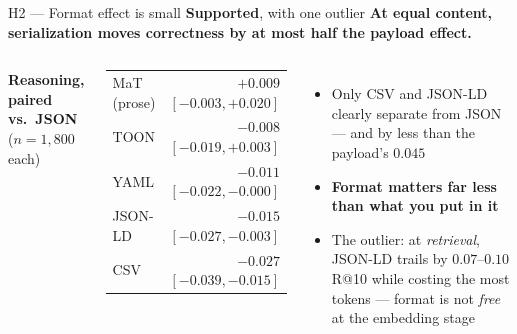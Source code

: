 \documentclass[aspectratio=169,10pt]{beamer}
\newcommand{\verdict}[1]{\textcolor{good}{\textbf{#1}}}
\newcommand{\muted}[1]{\textcolor{inksec}{#1}}
\begin{document}
\begin{frame}{H2 --- Format effect is small \hfill \verdict{Supported}\muted{, with one outlier}}
  \textbf{At equal content, serialization moves correctness by at most half the payload effect.}
  \bigskip
  \begin{columns}[t]
    \textbf{Reasoning, paired vs.\ JSON} \muted{($n{=}1{,}800$ each)}
    \begin{center}
    \renewcommand{\arraystretch}{1.25}
    \begin{tabular}{@{}lr@{}}
      \toprule
      MaT (prose) & $+0.009$ \;\muted{$[-0.003,+0.020]$} \\
      TOON & $-0.008$ \;\muted{$[-0.019,+0.003]$} \\
      YAML & $-0.011$ \;\muted{$[-0.022,-0.000]$} \\
      JSON-LD & $-0.015$ \;\muted{$[-0.027,-0.003]$} \\
      CSV & $-0.027$ \;\muted{$[-0.039,-0.015]$} \\
      \bottomrule
    \end{tabular}
    \end{center}
    \begin{itemize}
      \item Only CSV and JSON-LD clearly separate from JSON --- and by less than
        the payload's $0.045$
      \item \textbf{Format matters far less than what you put in it}
      \item The outlier: at \textit{retrieval}, JSON-LD trails by $0.07$--$0.10$ R@10
        while costing the most tokens --- format is not \textit{free} at the embedding stage
    \end{itemize}
  \end{columns}
\end{frame}
\end{document}
